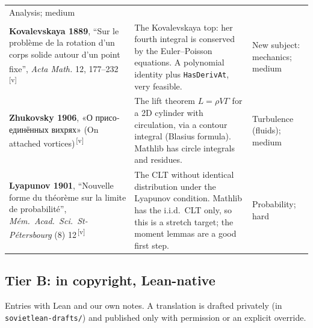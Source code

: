 \documentclass[11pt]{article}
\newcommand{\ru}[1]{\foreignlanguage{russian}{#1}}
\newcommand{\verify}{\textsuperscript{\color{gray}\,[v]}}
\begin{document}
\begin{tabularx}{\linewidth}{@{}p{4.3cm} Y p{3.1cm}@{}}
Analysis; medium \\
\textbf{Kovalevskaya 1889}, ``Sur le problème de la rotation d'un corps solide autour d'un point fixe'', \emph{Acta Math.} 12, 177--232\verify &
The Kovalevskaya top: her fourth integral is conserved by the Euler--Poisson equations. A polynomial identity plus \texttt{HasDerivAt}, very feasible. &
New subject: mechanics; medium \\
\textbf{Zhukovsky 1906}, \ru{«О присоединённых вихрях»} (On attached vortices)\verify &
The lift theorem $L=\rho V\Gamma$ for a 2D cylinder with circulation, via a contour integral (Blasius formula). Mathlib has circle integrals and residues. &
Turbulence (fluids); medium \\
\textbf{Lyapunov 1901}, ``Nouvelle forme du théorème sur la limite de probabilité'', \emph{Mém.\ Acad.\ Sci.\ St-Pétersbourg} (8) 12\verify &
The CLT without identical distribution under the Lyapunov condition. Mathlib has the i.i.d.\ CLT only, so this is a stretch target; the moment lemmas are a good first step. &
Probability; hard \\
\bottomrule
\end{tabularx}

\subsection{Tier B: in copyright, Lean-native}

Entries with Lean and our own notes. A translation is drafted privately (in \texttt{sovietlean-drafts/}) and published only with permission or an explicit override.
\end{document}

